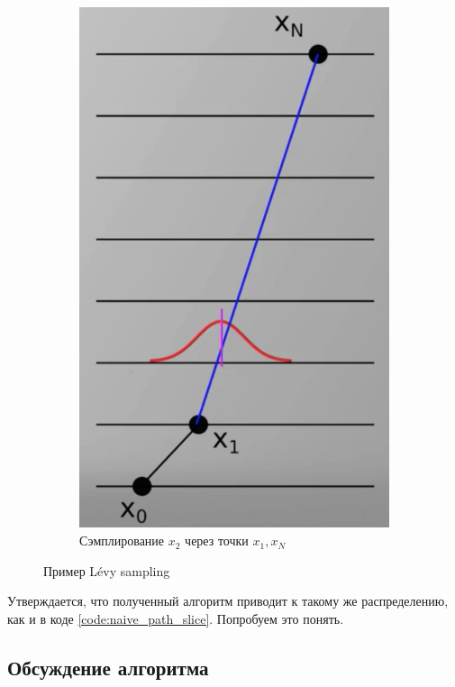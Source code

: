 \begin{lecture}
\begin{figure}[ht]
\begin{subfigure}{0.33\columnwidth}
            \includegraphics[width=\linewidth]{fig/x2-selection}
            \caption{Сэмплирование $x_2$ через точки $x_1, x_N$}
            \label{fig:x_2-levy_example}
        \end{subfigure}
        \caption{Пример Lévy sampling}
        \label{fig:x_k-levy-sampling}
    \end{figure}

    Утверждается, что полученный алгоритм приводит к такому же распределению, как и в коде \ref{code:naive_path_slice}.
    Попробуем это понять.

    \subsection{Обсуждение алгоритма}


\end{lecture}
